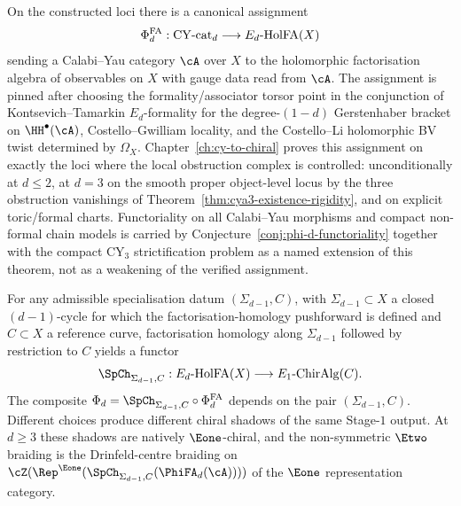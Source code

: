 \begin{theorem}
\label{wn:thm:platonic-intro-stage-1}
On the constructed loci there is a canonical assignment
\[
\Phi^{\mathrm{FA}}_d: \mathrm{CY}\text{-cat}_d \longrightarrow E_d\text{-}\mathrm{HolFA}(X)
\]
sending a Calabi--Yau category $\cA$ over $X$ to the holomorphic
factorisation algebra of observables on $X$ with gauge data read from
$\cA$. The assignment is pinned after choosing the
formality/associator torsor point in the conjunction of
Kontsevich--Tamarkin $E_d$-formality for the
degree-$(1-d)$ Gerstenhaber bracket on $\HH^\bullet(\cA)$,
Costello--Gwilliam locality, and the Costello--Li holomorphic BV
twist determined by $\Omega_X$. Chapter~\ref{ch:cy-to-chiral} proves
this assignment on exactly the loci where the local obstruction complex
is controlled: unconditionally at $d\leq 2$, at $d=3$ on the smooth
proper object-level locus by the three obstruction vanishings of
Theorem~\ref{thm:cya3-existence-rigidity}, and on explicit
toric/formal charts. Functoriality on all
Calabi--Yau morphisms and compact non-formal chain models is carried by
Conjecture~\ref{conj:phi-d-functoriality} together with the compact
CY$_3$ strictification problem as a named extension of this theorem,
not as a weakening of the verified assignment.
\end{theorem}

\begin{theorem}
\label{wn:thm:platonic-intro-stage-2}
For any admissible specialisation datum
$(\Sigma_{d-1}, C)$, with $\Sigma_{d-1}\subset X$ a closed
$(d{-}1)$-cycle for which the factorisation-homology pushforward is
defined and $C\subset X$ a reference curve, factorisation homology
along $\Sigma_{d-1}$ followed by restriction to $C$ yields a functor
\[
\SpCh_{\Sigma_{d-1}, C}: E_d\text{-}\HolFA(X) \longrightarrow
E_1\text{-}\ChirAlg(C).
\]
The composite $\Phi_d = \SpCh_{\Sigma_{d-1}, C} \circ \Phi^{\mathrm{FA}}_d$
depends on the pair $(\Sigma_{d-1}, C)$. Different choices produce
different chiral shadows of the same Stage-$1$ output. At
$d\geq 3$ these shadows are natively $\Eone$-chiral, and the
non-symmetric $\Etwo$ braiding is the Drinfeld-centre braiding on
$\cZ(\Rep^{\Eone}(\SpCh_{\Sigma_{d-1},C}(\PhiFA_d(\cA))))$ of the
$\Eone$ representation category.
\end{theorem}

